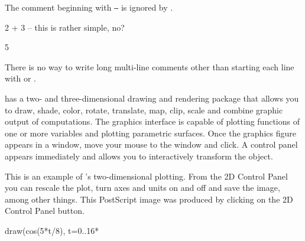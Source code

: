 {{{{{{{{\begin{xtc}
\begin{xtccomment}
The comment beginning with {\tt --} is ignored by \Language{}.
\end{xtccomment}
\begin{spadsrc}
2 + 3   -- this is rather simple, no?
\end{spadsrc}
\begin{TeXOutput}
\begin{fricasmath}{1}
5%
\end{fricasmath}
\end{TeXOutput}
\end{xtc}

There is no way to write long multi-line comments
other than starting each line with \spadSyntax{--} or
\spadSyntax{++}.

%

\Language{} has a two- and three-dimensional drawing and rendering
package that allows you to draw, shade, color, rotate, translate, map,
clip, scale and combine graphic output of \Language{} computations.
The graphics interface is capable of plotting functions of one or more
variables and plotting parametric surfaces.
Once the graphics figure appears in a window,
move your mouse to the window and click.
A control panel appears immediately  and allows you to
interactively transform the object.

\begin{psXtc}
\begin{xtccomment}
This is an example of \Language{}'s two-dimensional plotting.
From the 2D Control Panel you can rescale the plot, turn axes and units
on and off and save the image, among other things.
This PostScript image was produced by clicking on the
 2D Control Panel button.
\end{xtccomment}
\begin{spadsrc}
draw(cos(5*t/8), t=0..16*%
\end{spadsrc}
\end{psXtc}

}}}}}}}}

